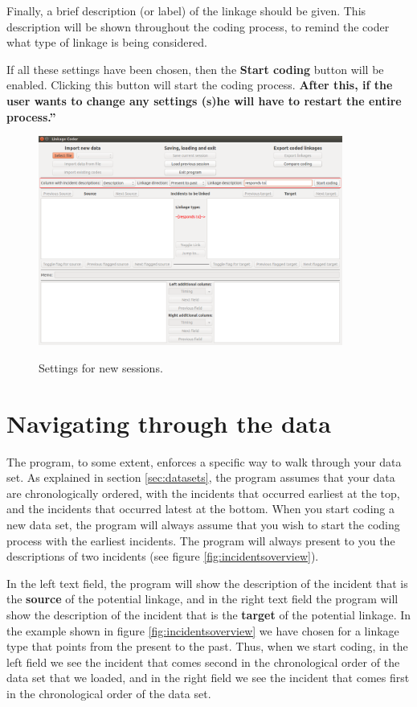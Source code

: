 \documentclass{memoir}
\begin{document}
Finally, a brief description (or label) of the linkage should be given. This description will be shown throughout the coding process, to remind the coder what type of linkage is being considered.

If all these settings have been chosen, then the \textbf{Start coding} button will be enabled. Clicking this button will start the coding process. \textbf{After this, if the user wants to change any settings (s)he will have to restart the entire process.''}

\begin{figure}[h!]
  \centering
  \caption{Settings for new sessions.}
  \includegraphics[width=100mm]{Screenshot_4.pdf}
  \label{fig:settings}
\end{figure}

\section{Navigating through the data}
\label{sec:navigatingdata}

The program, to some extent, enforces a specific way to walk through your data set. As explained in section \ref{sec:datasets}, the program assumes that your data are chronologically ordered, with the incidents that occurred earliest at the top, and the incidents that occurred latest at the bottom. When you start coding a new data set, the program will always assume that you wish to start the coding process with the earliest incidents. The program will always present to you the descriptions of two incidents (see figure \ref{fig:incidentsoverview}).

In the left text field, the program will show the description of the incident that is the \textbf{source} of the potential linkage, and in the right text field the program will show the description of the incident that is the \textbf{target} of the potential linkage. In the example shown in figure \ref{fig:incidentsoverview} we have chosen for a linkage type that points from the present to the past. Thus, when we start coding, in the left field we see the incident that comes second in the chronological order of the data set that we loaded, and in the right field we see the incident that comes first in the chronological order of the data set.
\end{document}
